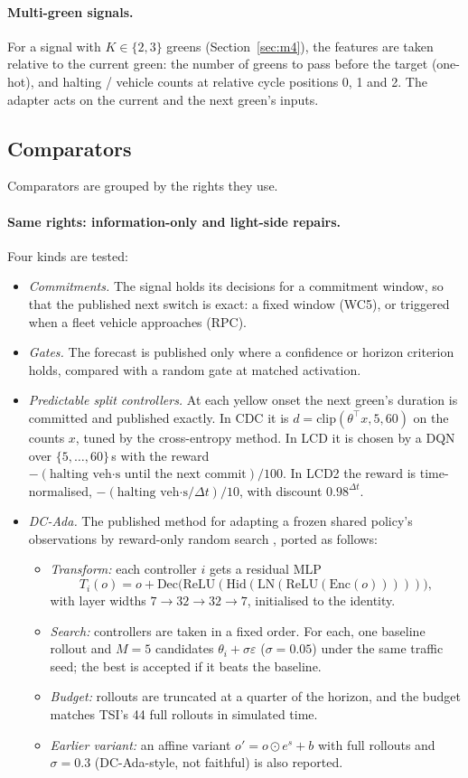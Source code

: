 \documentclass[11pt]{article}
\begin{document}
\paragraph{Multi-green signals.} For a signal with $K\in\{2,3\}$ greens (Section~\ref{sec:m4}), the features are taken relative to the
current green: the number of greens to pass before the target (one-hot), and halting / vehicle counts at relative cycle positions 0, 1 and
2. The adapter acts on the current and the next green's inputs.

\subsection{Comparators}\label{sec:comparators}
Comparators are grouped by the rights they use.
\paragraph{Same rights: information-only and light-side repairs.} Four kinds are tested:
\begin{itemize}\setlength\itemsep{1pt}
\item \emph{Commitments.} The signal holds its decisions for a commitment window, so that the published next switch is exact: a fixed
window (WC5), or triggered when a fleet vehicle approaches (RPC).
\item \emph{Gates.} The forecast is published only where a confidence or horizon criterion holds, compared with a random gate at matched
activation.
\item \emph{Predictable split controllers.} At each yellow onset the next green's duration is committed and published exactly. In CDC it
is $d=\mathrm{clip}(\theta^\top x,5,60)$ on the counts $x$, tuned by the cross-entropy method. In LCD it is chosen by a DQN over
$\{5,\dots,60\}$\,s with the reward $-(\text{halting veh·s until the next commit})/100$. In LCD2 the reward is time-normalised,
$-(\text{halting veh·s}/\Delta t)/10$, with discount $0.98^{\Delta t}$.
\item \emph{DC-Ada.} The published method for adapting a frozen shared policy's observations by reward-only random search
\cite{alqithami2026}, ported as follows:
\begin{itemize}\setlength\itemsep{0pt}
\item \emph{Transform:} each controller $i$ gets a residual MLP
\[T_i(o)=o+\mathrm{Dec}\big(\mathrm{ReLU}(\mathrm{Hid}(\mathrm{LN}(\mathrm{ReLU}(\mathrm{Enc}(o)))))\big),\]
with layer widths $7\to32\to32\to7$, initialised to the identity.
\item \emph{Search:} controllers are taken in a fixed order. For each, one baseline rollout and $M=5$ candidates
$\theta_i+\sigma\varepsilon$ ($\sigma=0.05$) under the same traffic seed; the best is accepted if it beats the baseline.
\item \emph{Budget:} rollouts are truncated at a quarter of the horizon, and the budget matches TSI's 44 full rollouts in simulated
time.
\item \emph{Earlier variant:} an affine variant $o'=o\odot e^{s}+b$ with full rollouts and $\sigma=0.3$ (DC-Ada-style, not faithful) is
also reported.
\end{itemize}
\end{itemize}
\end{document}

